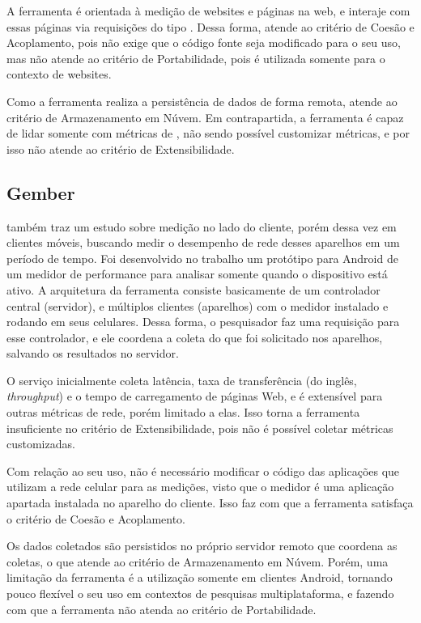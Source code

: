 \documentclass[12pt]{tcc}
\begin{document}
		A ferramenta é orientada à medição de websites e páginas na web, e interaje com essas páginas via requisições do tipo . Dessa forma, atende ao critério de Coesão e Acoplamento, pois não exige que o código fonte seja modificado para o seu uso, mas não atende ao critério de Portabilidade, pois é utilizada somente para o contexto de websites.

		Como a ferramenta realiza a persistência de dados de forma remota, atende ao critério de Armazenamento em Núvem. Em contrapartida, a ferramenta é capaz de lidar somente com métricas de , não sendo possível customizar métricas, e por isso não atende ao critério de Extensibilidade.

		
		\subsection{Gember}
		\par \citet{Gember2012Obtaining} também traz um estudo sobre medição no lado do cliente, porém dessa vez em clientes móveis, buscando medir o desempenho de rede desses aparelhos em um período de tempo. Foi desenvolvido no trabalho um protótipo para Android de um medidor de performance para analisar somente quando o dispositivo está ativo. A arquitetura da ferramenta consiste basicamente de um controlador central (servidor), e múltiplos clientes (aparelhos) com o medidor instalado e rodando em seus celulares. Dessa forma, o pesquisador faz uma requisição para esse controlador, e ele coordena a coleta do que foi solicitado nos aparelhos, salvando os resultados no servidor.

		O serviço inicialmente coleta latência, taxa de transferência (do inglês, \emph{throughput}) e o tempo de carregamento de páginas Web, e é extensível para outras métricas de rede, porém limitado a elas. Isso torna a ferramenta insuficiente no critério de Extensibilidade, pois não é possível coletar métricas customizadas. 

		Com relação ao seu uso, não é necessário modificar o código das aplicações que utilizam a rede celular para as medições, visto que o medidor é uma aplicação apartada instalada no aparelho do cliente. Isso faz com que a ferramenta satisfaça o critério de Coesão e Acoplamento. 
		
		Os dados coletados são persistidos no próprio servidor remoto que coordena as coletas, o que atende ao critério de Armazenamento em Núvem. Porém, uma limitação da ferramenta é a utilização somente em clientes Android, tornando pouco flexível o seu uso em contextos de pesquisas multiplataforma, e fazendo com que a ferramenta não atenda ao critério de Portabilidade.
\end{document}
